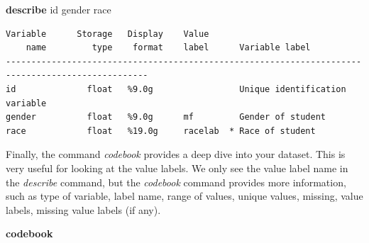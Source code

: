 \documentclass[
]{book}
\newenvironment{Shaded}{\begin{snugshade}}{\end{snugshade}}
\newcommand{\KeywordTok}[1]{\textcolor[rgb]{0.13,0.29,0.53}{\textbf{#1}}}
\newcommand{\NormalTok}[1]{#1}
\begin{document}
\begin{Shaded}
\begin{Highlighting}[]
\KeywordTok{describe}\NormalTok{ id gender race}
\end{Highlighting}
\end{Shaded}

\begin{verbatim}
Variable      Storage   Display    Value
    name         type    format    label      Variable label
--------------------------------------------------------------------------------------------------
id              float   %9.0g                 Unique identification variable
gender          float   %9.0g      mf         Gender of student
race            float   %19.0g     racelab  * Race of student
\end{verbatim}

Finally, the command \emph{codebook} provides a deep dive into your dataset. This is very useful for looking at the value labels. We only see the value label name in the \emph{describe} command, but the \emph{codebook} command provides more information, such as type of variable, label name, range of values, unique values, missing, value labels, missing value labels (if any).

\begin{Shaded}
\begin{Highlighting}[]
\KeywordTok{codebook}
\end{Highlighting}
\end{Shaded}
\end{document}

